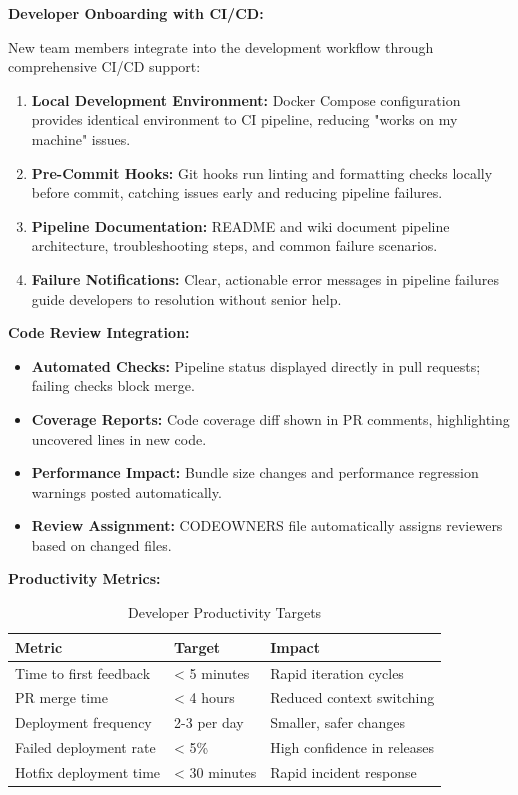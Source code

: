 \documentclass[12pt,a4paper]{article}
\begin{document}
\textbf{Developer Onboarding with CI/CD:}

New team members integrate into the development workflow through comprehensive CI/CD support:

\begin{enumerate}[leftmargin=2em, itemsep=6pt]
    \item \textbf{Local Development Environment:} Docker Compose configuration provides identical environment to CI pipeline, reducing "works on my machine" issues.
    \item \textbf{Pre-Commit Hooks:} Git hooks run linting and formatting checks locally before commit, catching issues early and reducing pipeline failures.
    \item \textbf{Pipeline Documentation:} README and wiki document pipeline architecture, troubleshooting steps, and common failure scenarios.
    \item \textbf{Failure Notifications:} Clear, actionable error messages in pipeline failures guide developers to resolution without senior help.
\end{enumerate}

\vspace{0.5em}

\textbf{Code Review Integration:}

\begin{itemize}[leftmargin=2em, itemsep=6pt]
    \item \textbf{Automated Checks:} Pipeline status displayed directly in pull requests; failing checks block merge.
    \item \textbf{Coverage Reports:} Code coverage diff shown in PR comments, highlighting uncovered lines in new code.
    \item \textbf{Performance Impact:} Bundle size changes and performance regression warnings posted automatically.
    \item \textbf{Review Assignment:} CODEOWNERS file automatically assigns reviewers based on changed files.
\end{itemize}

\vspace{0.5em}

\textbf{Productivity Metrics:}

\begin{table}[H]
\centering
\begin{tabular}{|p{5cm}|p{3cm}|p{5cm}|}
\hline
\textbf{Metric} & \textbf{Target} & \textbf{Impact} \\
\hline
Time to first feedback & < 5 minutes & Rapid iteration cycles \\
\hline
PR merge time & < 4 hours & Reduced context switching \\
\hline
Deployment frequency & 2-3 per day & Smaller, safer changes \\
\hline
Failed deployment rate & < 5\% & High confidence in releases \\
\hline
Hotfix deployment time & < 30 minutes & Rapid incident response \\
\hline
\end{tabular}
\caption{Developer Productivity Targets}
\end{table}
\end{document}
